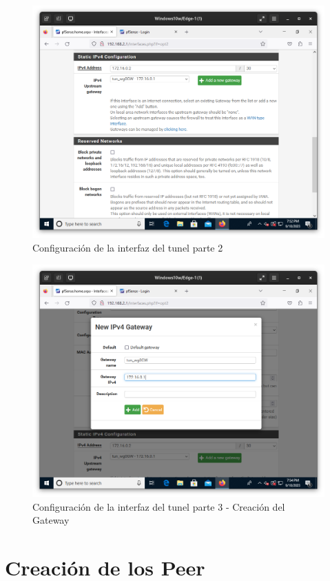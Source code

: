 \begin{figure}[H]
	\centering
	\includegraphics[scale=0.30]{07}
	\caption{Configuración de la interfaz del tunel parte 2}
\end{figure}

\begin{figure}[H]
	\centering
	\includegraphics[scale=0.30]{08}
	\caption{Configuración de la interfaz del tunel parte 3 - Creación del Gateway}
\end{figure}

\newpage
\section{Creación de los Peer}

